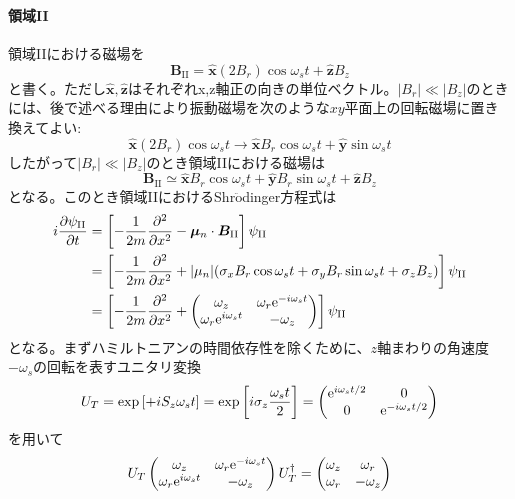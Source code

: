 \paragraph{領域II}
領域IIにおける磁場を
\begin{equation}
\bm{B}_{\mathrm{II}}=\hat{\bm{x}} (2B_r)\cos \omega_s t+\hat{\bm{z}} B_z
\end{equation}
と書く。ただし$\hat{\bm{x}},\hat{\bm{z}}$はそれぞれx,z軸正の向きの単位ベクトル。$|B_r| \ll |B_z|$のときには、後で述べる理由により振動磁場を次のような$xy$平面上の回転磁場に置き換えてよい:
\begin{equation}
\hat{\bm{x}} (2B_r)\cos \omega_s t \rightarrow \hat{\bm{x}} B_r \cos \omega_s t+\hat{\bm{y}} \sin \omega_s t
\end{equation}
したがって$|B_r| \ll |B_z|$のとき領域IIにおける磁場は
\begin{equation}
\bm{B}_{\mathrm{II}}\simeq \hat{\bm{x}} B_r\cos \omega_s t+\hat{\bm{y}} B_r \sin \omega_s t+\hat{\bm{z}} B_z
\end{equation}
となる。このとき領域IIにおけるShr$\ddot{\mathrm{o}}$dinger方程式は
\begin{align}
i\frac{\partial \psi_{\mathrm{II}}}{\partial t} &=\left[-\frac{1}{2m} \frac{\partial^2}{\partial x^2} -\bm{\mu}_n\cdot\bm{B}_\mathrm{II}\right] \psi_\mathrm{II}\notag \\
&=\left[-\frac{1}{2m} \frac{\partial^2}{\partial x^2} + |\mu_n| (\sigma_x B_r \cos\omega_s t+\sigma_y B_r\sin\omega_s t+\sigma_zB_z)\right] \psi_\mathrm{II} \notag \\
&=\left[-\frac{1}{2m} \frac{\partial^2}{\partial x^2} +\begin{pmatrix} \omega_z &\omega_r \mathrm{e}^{-i\omega_s t} \\\omega_r \mathrm{e}^{i\omega_s t} &-\omega_z \end{pmatrix}\right] \psi_\mathrm{II}
\end{align}
となる。まずハミルトニアンの時間依存性を除くために、$z$軸まわりの角速度$-\omega_s$の回転を表すユニタリ変換
\begin{equation}
U_T=\exp\left[+iS_z\omega_s t\right] =\exp\left[i\sigma_z\frac{\omega_s t}{2}\right]=\begin{pmatrix} \mathrm{e}^{i\omega_st/2} &0\\0&\mathrm{e}^{-i\omega_st/2}\end{pmatrix}
\end{equation}
を用いて
\begin{equation}
U_T \begin{pmatrix} \omega_z &\omega_r \mathrm{e}^{-i\omega_s t} \\\omega_r \mathrm{e}^{i\omega_s t} &-\omega_z \end{pmatrix} U_T^\dagger =\begin{pmatrix} \omega_z &\omega_r\\ \omega_r&-\omega_z \end{pmatrix}
\end{equation}
